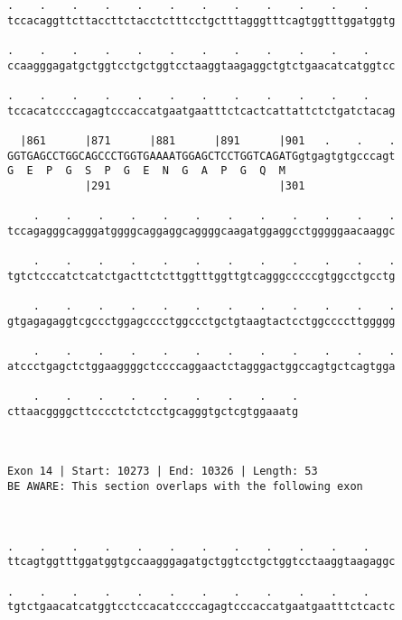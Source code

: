 \documentclass{article}
\begin{document}
\begin{Verbatim}
.    .    .    .    .    .    .    .    .    .    .    .    
tccacaggttcttaccttctacctctttcctgctttagggtttcagtggtttggatggtg
                                                            
.    .    .    .    .    .    .    .    .    .    .    .    
ccaagggagatgctggtcctgctggtcctaaggtaagaggctgtctgaacatcatggtcc
                                                            
.    .    .    .    .    .    .    .    .    .    .    .    
tccacatccccagagtcccaccatgaatgaatttctcactcattattctctgatctacag
                                                            
  |861      |871      |881      |891      |901   .    .    .
GGTGAGCCTGGCAGCCCTGGTGAAAATGGAGCTCCTGGTCAGATGgtgagtgtgcccagt
G  E  P  G  S  P  G  E  N  G  A  P  G  Q  M                 
            |291                          |301              
  
    .    .    .    .    .    .    .    .    .    .    .    .
tccagagggcagggatggggcaggaggcaggggcaagatggaggcctgggggaacaaggc
                                                            
    .    .    .    .    .    .    .    .    .    .    .    .
tgtctcccatctcatctgacttctcttggtttggttgtcagggcccccgtggcctgcctg
                                                            
    .    .    .    .    .    .    .    .    .    .    .    .
gtgagagaggtcgccctggagcccctggccctgctgtaagtactcctggccccttggggg
                                                            
    .    .    .    .    .    .    .    .    .    .    .    .
atccctgagctctggaaggggctccccaggaactctagggactggccagtgctcagtgga
                                                            
    .    .    .    .    .    .    .    .    .
cttaacggggcttcccctctctcctgcagggtgctcgtggaaatg
                                             
                                             
 
Exon 14 | Start: 10273 | End: 10326 | Length: 53
BE AWARE: This section overlaps with the following exon



.    .    .    .    .    .    .    .    .    .    .    .    
ttcagtggtttggatggtgccaagggagatgctggtcctgctggtcctaaggtaagaggc
                                                            
.    .    .    .    .    .    .    .    .    .    .    .    
tgtctgaacatcatggtcctccacatccccagagtcccaccatgaatgaatttctcactc
                                                            

\end{Verbatim}
\end{document}

